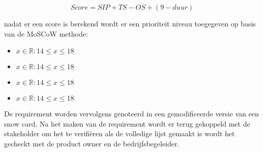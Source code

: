 \whitespace
	\begin{equation}
		\label{eq:prioritization}
		Score = SIP + TS - OS + (9 - duur)
	\end{equation}

\whitespace
nadat er een score is berekend wordt er een prioriteit niveau toegegeven op basis van de MoSCoW methode:

\begin{itemize}
	\item{ $x \in \mathbb{R} : 14 \leq x \leq 18$}
	\item{ $x \in \mathbb{R} : 14 \leq x \leq 18$}
	\item{ $x \in \mathbb{R} : 14 \leq x \leq 18$}
	\item{ $x \in \mathbb{R} : 14 \leq x \leq 18$}
\end{itemize}

\whitespace
De requirement worden vervolgens genoteerd in een gemodificeerde versie van een snow card.
Na het maken van de requirement wordt er terug gekoppeld met de stakeholder om het te verifiëren
als de volledige lijst gemaakt is wordt het gecheckt met de product owner en de bedrijfsbegeleider.
\whitespace
{}

